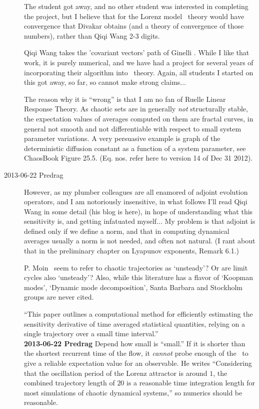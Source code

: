 \begin{description}
The student got away, and no other student was interested in
completing the project, but I believe that for the Lorenz model \po\
theory would have convergence that Divakar obtains (and a
theory of convergence of those numbers), rather than Qiqi
Wang 2-3 digits.

Qiqi Wang takes the 'covariant vectors' path of
Ginelli \etal{}. While I like that work, it is
purely numerical, and we have had a project for several years of
incorporating their algorithm into \po\ theory. Again, all students I
started on this got away, so far, so cannot make strong claims...

The reason why it is ``wrong'' is that I am no fan of
Ruelle Linear Response Theory. As chaotic sets
are in generally \emph{not} structurally stable, the expectation
values of averages computed on them are fractal curves, in general
not smooth and not differentiable with respect to small system
parameter variations.
A very persuasive example is graph of the deterministic diffusion
constant as a function of a system parameter, see ChaosBook
Figure 25.5. (Eq. nos. refer here to
 {version 14} of Dec
31 2012).

\item[2013-06-22 Predrag]
However, as my plumber colleagues are all enamored of adjoint
evolution operators, and I am notoriously insensitive,
in what follows I'll
read Qiqi Wang in some detail (his blog is
 {here}), in hope of understanding
what this sensitivity is, and
getting infatuated myself... My problem is that adjoint is defined
only if we define a norm, and that in computing dynamical averages
usually a norm is not needed, and often not natural. (I rant about that
in the preliminary chapter on
 {Lyapunov exponents},
Remark 6.1.)

                                        \toCB
P. Moin \etal\ seem to refer to chaotic trajectories as `unsteady'?
Or are limit cycles also `unsteady'? Also, while this literature has
a flavor of `Koopman modes', `Dynamic mode decomposition', Santa
Barbara and Stockholm groups are never cited.

``This paper outlines a computational method for efficiently
estimating the sensitivity derivative of time averaged statistical
quantities, relying on a single trajectory over a small time interval.''
\\
{\bf 2013-06-22 Predrag} Depend how small is ``small.'' If it is
shorter than the shortest recurrent time of the flow, it
\emph{cannot} probe enough of the \statesp\ to give a reliable
expectation value for an observable. He writes ``Considering that the
oscillation period of the Lorenz attractor is around $1$, the
combined trajectory length of $20$ is a reasonable time integration
length for most simulations of chaotic dynamical systems,'' so
numerics should be reasonable.


\end{description}
